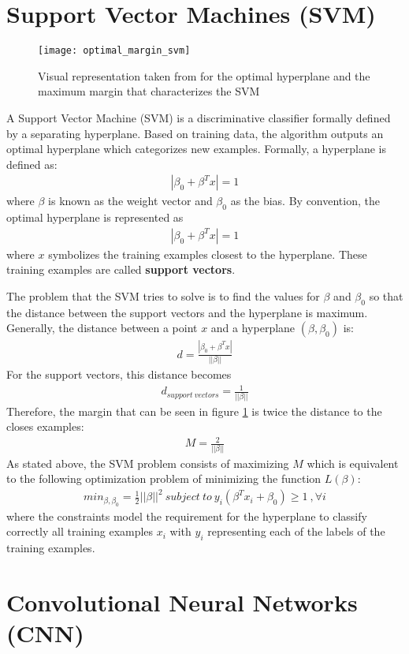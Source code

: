 \section{Support Vector Machines (SVM)}
\begin{figure}[H]
	\captionsetup{width=15cm,font=small}
	\begin{center}
		\texttt{[image: optimal\_margin\_svm]}
		\caption[Support Vector Machine optimal hyperplane]{Visual representation taken from \cite{itseez2014theopencv} for the optimal hyperplane and the maximum margin that characterizes the SVM}
		\label{fig:optimal_margin_svm}
	\end{center}
\end{figure}
A Support Vector Machine (SVM) is a discriminative classifier formally defined by a separating hyperplane. Based on training data, the algorithm outputs an optimal hyperplane which categorizes new examples. Formally, a hyperplane is defined as:
\begin{align}
	|\beta_{0} + \beta^{T}x| = 1
\end{align}
where $\beta$ is known as the weight vector and $\beta_{0}$ as the bias.
By convention, the optimal hyperplane is represented as
\begin{align}
	|\beta_{0} + \beta^{T}x| = 1
\end{align}
where $x$  symbolizes the training examples closest to the hyperplane. These training examples are called \textbf{support vectors}. 

The problem that the SVM tries to solve is to find the values for $\beta$ and $\beta_{0}$ so that the distance between the support vectors and the hyperplane is maximum. Generally, the distance between a point $x$ and a hyperplane $(\beta, \beta_{0})$ is:
\begin{align}
d = \frac{|\beta_{0} + \beta^{T}x|}{||\beta||}
\end{align}
For the support vectors, this distance becomes
\begin{align}
d_{support\ vectors} = \frac{1}{||\beta||}
\end{align}
Therefore, the margin that can be seen in figure \ref{fig:optimal_margin_svm} is twice the distance to the closes examples:
\begin{align}
M = \frac{2}{||\beta||}
\end{align}
As stated above, the SVM problem consists of maximizing $M$ which is equivalent to the following optimization problem of minimizing the function $L(\beta)$:
\begin{align}
min_{\beta, \beta_{0}} = \frac{1}{2}||\beta||^2\ subject\ to\ y_i(\beta^T x_{i} + \beta_{0}) \geq 1\ ,\forall i
\end{align}
where the constraints model the requirement for the hyperplane to classify correctly all training examples $x_i$ with $y_i$ representing each of the labels of the training examples.
\section{Convolutional Neural Networks (CNN)}